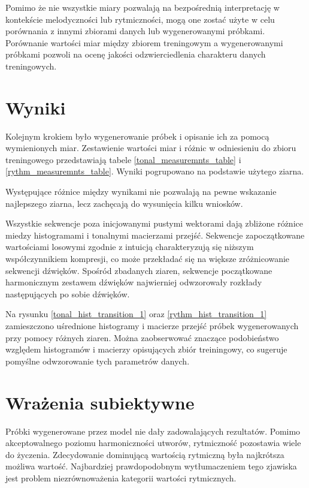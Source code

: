 {{        Pomimo że nie wszystkie miary pozwalają na bezpośrednią interpretację w kontekście melodyczności lub rytmiczności, 
        mogą one zostać użyte w celu porównania z innymi zbiorami danych lub wygenerowanymi próbkami. 
        Porównanie wartości miar między zbiorem treningowym a wygenerowanymi próbkami pozwoli na ocenę 
        jakości odzwierciedlenia charakteru danych treningowych.
    }

    \section{Wyniki}
    {
        Kolejnym krokiem było wygenerowanie próbek i opisanie ich za pomocą wymienionych miar. Zestawienie wartości miar i różnic
        w odniesieniu do zbioru treningowego przedstawiają tabele \ref{tonal_measuremnts_table} i \ref{rythm_measuremnts_table}. Wyniki pogrupowano na podstawie użytego ziarna.

        
        
        

        Występujące różnice między wynikami nie pozwalają na pewne wskazanie najlepszego ziarna, lecz 
        zachęcają do wysunięcia kilku wniosków.

        Wszystkie sekwencje poza inicjowanymi pustymi wektorami dają zbliżone różnice miedzy histogramami i 
        tonalnymi macierzami przejść. 
        Sekwencje zapoczątkowane wartościami losowymi zgodnie z intuicją charakteryzują się niższym współczynnikiem
        kompresji, co może przekładać się na większe zróżnicowanie sekwencji dźwięków.
        Spośród zbadanych ziaren, sekwencje początkowane harmonicznym zestawem dźwięków najwierniej
        odwzorowały rozkłady następujących po sobie dźwięków.

        
        Na rysunku \ref{tonal_hist_transition_1} oraz \ref{rythm_hist_transition_1} zamieszczono uśrednione 
        histogramy i macierze przejść próbek wygenerowanych przy pomocy różnych ziaren. 
        Można zaobserwować znaczące podobieństwo względem histogramów i macierzy opisujących zbiór treiningowy, co sugeruje pomyślne odwzorowanie tych parametrów danych.

        

        
    }

    \section{Wrażenia subiektywne}
    {
        Próbki wygenerowane przez model nie dały zadowalających rezultatów. Pomimo akceptowalnego poziomu 
        harmoniczności utworów, rytmiczność pozostawia wiele do życzenia. Zdecydowanie dominującą wartością 
        rytmiczną była najkrótsza możliwa wartość. Najbardziej prawdopodobnym wytłumaczeniem tego zjawiska jest 
        problem niezrównoważenia kategorii wartości rytmicznych. 

}}
